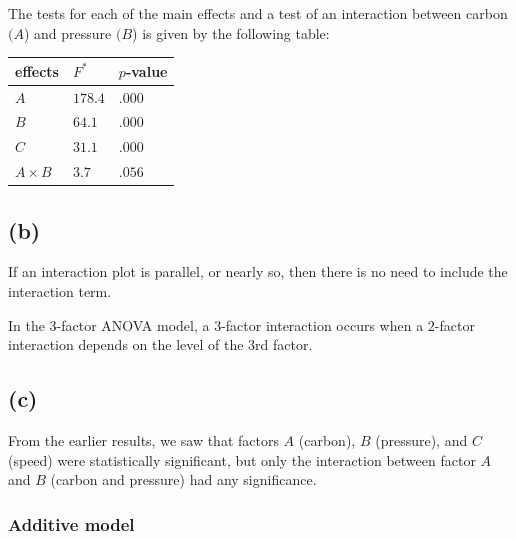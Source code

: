 \documentclass[
  11pt,
]{article}
\begin{document}
The tests for each of the main effects and a test of an interaction
between carbon \((A\)) and pressure \((B\)) is given by the following
table:

\begin{longtable}[]{@{}lll@{}}
\toprule\noalign{}
effects & \(F^*\) & \(p\)-value \\
\midrule\noalign{}
\endhead
\bottomrule\noalign{}
\endlastfoot
\(A\) & \(178.4\) & \(.000\) \\
\(B\) & \(64.1\) & \(.000\) \\
\(C\) & \(31.1\) & \(.000\) \\
\(A \times B\) & \(3.7\) & \(.056\) \\
\end{longtable}

\hypertarget{b}{%
\subsection{(b)}\label{b}}


If an interaction plot is parallel, or nearly so, then there is no need
to include the interaction term.

In the \(3\)-factor ANOVA model, a \(3\)-factor interaction occurs when
a \(2\)-factor interaction depends on the level of the \(3\)rd factor.

\hypertarget{c}{%
\subsection{(c)}\label{c}}


From the earlier results, we saw that factors \(A\) (carbon), \(B\)
(pressure), and \(C\) (speed) were statistically significant, but only
the interaction between factor \(A\) and \(B\) (carbon and pressure) had
any significance.

\hypertarget{additive-model}{%
\subsubsection{Additive model}\label{additive-model}}
\end{document}
